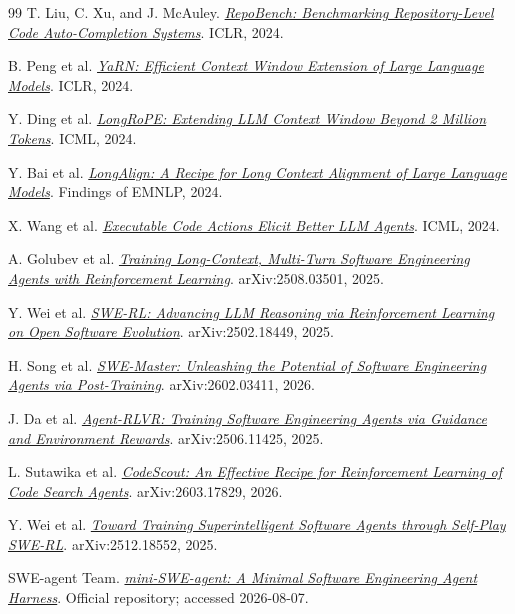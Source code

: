 \documentclass[10pt,a4paper,UTF8,fontset=none]{ctexart}
\begin{document}
\begin{thebibliography}{99}
T. Liu, C. Xu, and J. McAuley. \href{https://arxiv.org/abs/2306.03091}{\textit{RepoBench: Benchmarking Repository-Level Code Auto-Completion Systems}}. ICLR, 2024.

B. Peng et al. \href{https://arxiv.org/abs/2309.00071}{\textit{YaRN: Efficient Context Window Extension of Large Language Models}}. ICLR, 2024.

Y. Ding et al. \href{https://arxiv.org/abs/2402.13753}{\textit{LongRoPE: Extending LLM Context Window Beyond 2 Million Tokens}}. ICML, 2024.

Y. Bai et al. \href{https://arxiv.org/abs/2401.18058}{\textit{LongAlign: A Recipe for Long Context Alignment of Large Language Models}}. Findings of EMNLP, 2024.

X. Wang et al. \href{https://arxiv.org/abs/2402.01030}{\textit{Executable Code Actions Elicit Better LLM Agents}}. ICML, 2024.

A. Golubev et al. \href{https://arxiv.org/abs/2508.03501}{\textit{Training Long-Context, Multi-Turn Software Engineering Agents with Reinforcement Learning}}. arXiv:2508.03501, 2025.

Y. Wei et al. \href{https://arxiv.org/abs/2502.18449}{\textit{SWE-RL: Advancing LLM Reasoning via Reinforcement Learning on Open Software Evolution}}. arXiv:2502.18449, 2025.

H. Song et al. \href{https://arxiv.org/abs/2602.03411}{\textit{SWE-Master: Unleashing the Potential of Software Engineering Agents via Post-Training}}. arXiv:2602.03411, 2026.

J. Da et al. \href{https://arxiv.org/abs/2506.11425}{\textit{Agent-RLVR: Training Software Engineering Agents via Guidance and Environment Rewards}}. arXiv:2506.11425, 2025.

L. Sutawika et al. \href{https://arxiv.org/abs/2603.17829}{\textit{CodeScout: An Effective Recipe for Reinforcement Learning of Code Search Agents}}. arXiv:2603.17829, 2026.

Y. Wei et al. \href{https://arxiv.org/abs/2512.18552}{\textit{Toward Training Superintelligent Software Agents through Self-Play SWE-RL}}. arXiv:2512.18552, 2025.

SWE-agent Team. \href{https://github.com/SWE-agent/mini-swe-agent}{\textit{mini-SWE-agent: A Minimal Software Engineering Agent Harness}}. Official repository; accessed 2026-08-07.


\end{thebibliography}
\end{document}
